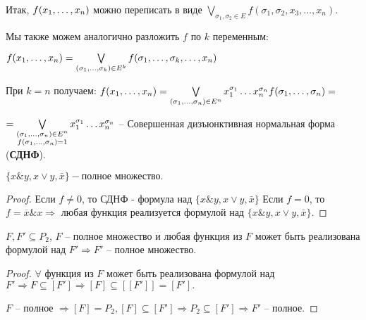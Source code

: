 Итак, $f(x_1, \ldots, x_n)$ можно переписать в виде $\bigvee \limits_{\sigma_1, \sigma_2 \in E} f(\sigma_1, \sigma_2, x_3, \ldots, x_n)$.

Мы также можем аналогично разложить $f$ по $k$ переменным:

$f(x_1, \ldots, x_n) = \bigvee \limits_{(\sigma_1,\ldots, \sigma_k) \in E^k} f(\sigma_1, \ldots, \sigma_k, \ldots, x_n)$

При $k = n$ получаем:  $f(x_1, \ldots, x_n) = \bigvee \limits_{(\sigma_1,\ldots, \sigma_n) \in E^n} x_1^{\sigma_1}\ldots x_n^{\sigma_n}f(\sigma_1, \ldots, \sigma_n) =$

$ = \bigvee \limits_{\substack{(\sigma_1,\ldots, \sigma_n) \in E^n \\ f(\sigma_1, \ldots, \sigma_n) = 1}} x_1^{\sigma_1}\ldots x_n^{\sigma_n} $ -- {\large Совершенная дизъюнктивная нормальная форма ({\bf СДНФ}).}








\begin{statement}
$	\{x\&y, x \vee y, \bar{x} \} - \text{полное множество.} $
\end{statement}
\begin{proof}
    Если $f \ne 0$, то СДНФ - формула над $\{x\&y, x \vee y, \bar{x} \}$
    Если $f = 0$, то $f = \overline{x} \& x \Rightarrow $ любая функция реализуется формулой над $\{x\&y, x \vee y, \bar{x} \}$.
\end{proof}

\begin{lemma}
	$F, F' \subseteq P_2$, $F$ -- полное множество и любая функция из $F$ может быть реализована формулой над $F' \Rightarrow F'$ -- полное множество.
\end{lemma}
\begin{proof}
	$\forall$ функция из $F$ может быть реализована формулой над $F' \Rightarrow F \subseteq [F'] \Rightarrow [F] \subseteq [[F']] = [F'].$

	$F$ -- полное $\Rightarrow [F] = P_2, [F] \subseteq [F'] \Rightarrow P_2 \subseteq [F'] \Rightarrow F'$ -- полное.
\end{proof}

